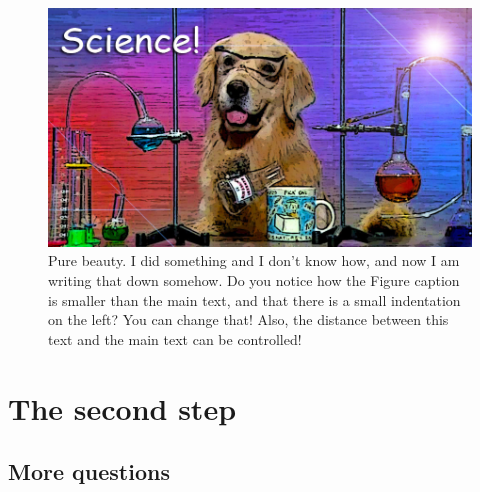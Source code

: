 \begin{figure}
  \centering
  \includegraphics[width=1.0\linewidth]{Sections/Chapter1/Figures/dogs_do_science2.jpg}
  \caption{
    \textcolor{\chapclr}{Pure beauty.}
    I did something and I don't know how, and now I am writing that down somehow. Do you notice how the Figure caption is smaller than the main text, and that there is a small indentation on the left? You can change that! Also, the distance between this text and the main text can be controlled!
    }
  \label{fig:ch1-dog}
\end{figure}

\section{The second step}
\blindtext[1]
\subsection{More questions}
\blindtext[5]

